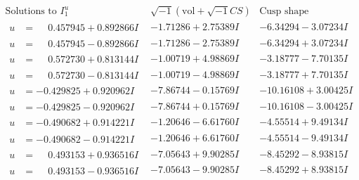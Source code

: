 \documentclass[1p]{elsarticle_modified}
\theoremstyle{definition}
\newcommand{\I}{\sqrt{-1}}
\begin{document}
$$\begin{array}{c|c|c}  
\text{Solutions to }I^u_{1}& \I (\text{vol} + \sqrt{-1}CS) & \text{Cusp shape}\\
 \hline 
\begin{aligned}
u &= \phantom{-}0.457945 + 0.892866 I\end{aligned}
 & -1.71286 + 2.75389 I & -6.34294 - 3.07234 I \\ \hline\begin{aligned}
u &= \phantom{-}0.457945 - 0.892866 I\end{aligned}
 & -1.71286 - 2.75389 I & -6.34294 + 3.07234 I \\ \hline\begin{aligned}
u &= \phantom{-}0.572730 + 0.813144 I\end{aligned}
 & -1.00719 + 4.98869 I & -3.18777 - 7.70135 I \\ \hline\begin{aligned}
u &= \phantom{-}0.572730 - 0.813144 I\end{aligned}
 & -1.00719 - 4.98869 I & -3.18777 + 7.70135 I \\ \hline\begin{aligned}
u &= -0.429825 + 0.920962 I\end{aligned}
 & -7.86744 - 0.15769 I & -10.16108 + 3.00425 I \\ \hline\begin{aligned}
u &= -0.429825 - 0.920962 I\end{aligned}
 & -7.86744 + 0.15769 I & -10.16108 - 3.00425 I \\ \hline\begin{aligned}
u &= -0.490682 + 0.914221 I\end{aligned}
 & -1.20646 - 6.61760 I & -4.55514 + 9.49134 I \\ \hline\begin{aligned}
u &= -0.490682 - 0.914221 I\end{aligned}
 & -1.20646 + 6.61760 I & -4.55514 - 9.49134 I \\ \hline\begin{aligned}
u &= \phantom{-}0.493153 + 0.936516 I\end{aligned}
 & -7.05643 + 9.90285 I & -8.45292 - 8.93815 I \\ \hline\begin{aligned}
u &= \phantom{-}0.493153 - 0.936516 I\end{aligned}
 & -7.05643 - 9.90285 I & -8.45292 + 8.93815 I \\ \hline\begin{aligned}

\end{aligned}
\end{array}$$
\end{document}
